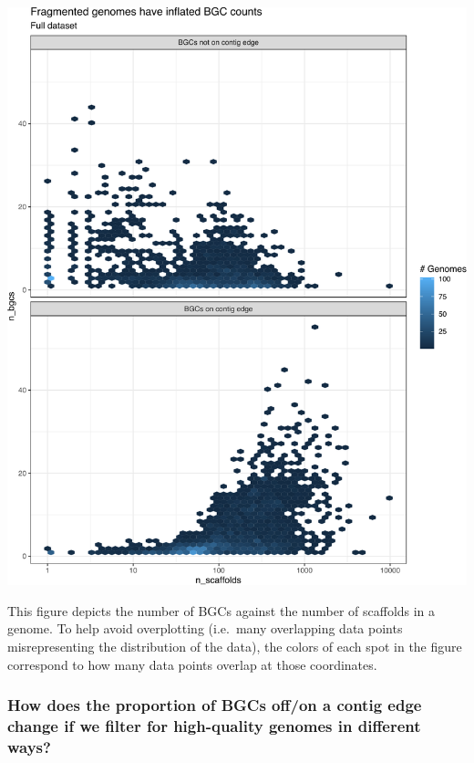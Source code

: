\documentclass[
]{article}
\begin{document}
\includegraphics{analysis_files/figure-latex/unnamed-chunk-3-1.pdf}

This figure depicts the number of BGCs against the number of scaffolds
in a genome. To help avoid overplotting (i.e.~many overlapping data
points misrepresenting the distribution of the data), the colors of each
spot in the figure correspond to how many data points overlap at those
coordinates.

\hypertarget{how-does-the-proportion-of-bgcs-offon-a-contig-edge-change-if-we-filter-for-high-quality-genomes-in-different-ways}{%
\subsubsection{How does the proportion of BGCs off/on a contig edge
change if we filter for high-quality genomes in different
ways?}\label{how-does-the-proportion-of-bgcs-offon-a-contig-edge-change-if-we-filter-for-high-quality-genomes-in-different-ways}}
\end{document}
